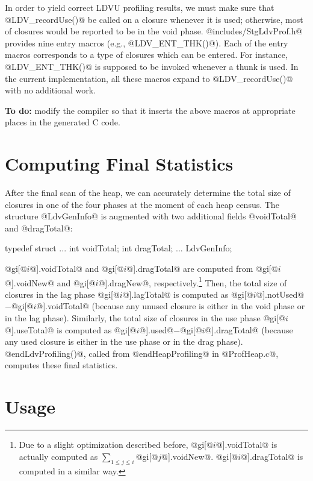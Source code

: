 \documentclass{article}
\begin{document}
In order to yield correct LDVU profiling results, we must make sure that
@LDV_recordUse()@ be called on a closure whenever it is used; otherwise,
most of closures would be reported to be in the void phase.
@includes/StgLdvProf.h@ provides nine entry macros (e.g., @LDV_ENT_THK()@).
Each of the entry macros corresponds to a type of closures which can be entered.
For instance, @LDV_ENT_THK()@ is supposed to be invoked whenever a thunk
is used. In the current implementation, all these macros expand to 
@LDV_recordUse()@ with no additional work.

\textbf{To do:} modify the compiler so that it inserts the above macros
at appropriate places in the generated C code.

\section{Computing Final Statistics}

After the final scan of the heap, we can accurately determine the total
size of closures in one of the four phases at the moment of each heap census.
The structure @LdvGenInfo@ is augmented with two additional fields 
@voidTotal@ and @dragTotal@:

\begin{code}
typedef struct {
  ...
  int voidTotal;
  int dragTotal;
  ...
} LdvGenInfo;
\end{code} 

@gi[@$i$@].voidTotal@ and @gi[@$i$@].dragTotal@ are computed
from @gi[@$i$@].voidNew@ and @gi[@$i$@].dragNew@, respectively.\footnote{Due
to a slight optimization described before, @gi[@$i$@].voidTotal@ is actually
computed as $\sum_{1 \leq j \leq i}$@gi[@$j$@].voidNew@. 
@gi[@$i$@].dragTotal@ is computed in a similar way.}
Then, the total size of closures in the lag phase @gi[@$i$@].lagTotal@ is computed
as @gi[@$i$@].notUsed@$-$@gi[@$i$@].voidTotal@ (because any unused closure
is either in the void phase or in the lag phase).
Similarly, 
the total size of closures in the use phase @gi[@$i$@].useTotal@ is computed
as @gi[@$i$@].used@$-$@gi[@$i$@].dragTotal@ (because any used closure
is either in the use phase or in the drag phase).
@endLdvProfiling()@, called from @endHeapProfiling@ in @ProfHeap.c@, computes these 
final statistics.

\section{Usage}
\end{document}
